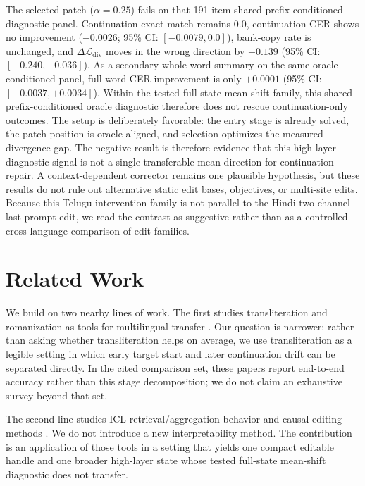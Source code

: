 \documentclass{article}
\begin{document}
The selected patch ($\alpha{=}0.25$) fails on that 191-item shared-prefix-conditioned diagnostic panel. Continuation exact match remains 0.0, continuation CER shows no improvement ($-0.0026$; 95\% CI: $[-0.0079, 0.0]$), bank-copy rate is unchanged, and $\Delta \mathcal{L}_{\mathrm{div}}$ moves in the wrong direction by $-0.139$ (95\% CI: $[-0.240, -0.036]$). As a secondary whole-word summary on the same oracle-conditioned panel, full-word CER improvement is only $+0.0001$ (95\% CI: $[-0.0037, +0.0034]$). Within the tested full-state mean-shift family, this shared-prefix-conditioned oracle diagnostic therefore does not rescue continuation-only outcomes. The setup is deliberately favorable: the entry stage is already solved, the patch position is oracle-aligned, and selection optimizes the measured divergence gap. The negative result is therefore evidence that this high-layer diagnostic signal is not a single transferable mean direction for continuation repair. A context-dependent corrector remains one plausible hypothesis, but these results do not rule out alternative static edit bases, objectives, or multi-site edits. Because this Telugu intervention family is not parallel to the Hindi two-channel last-prompt edit, we read the contrast as suggestive rather than as a controlled cross-language comparison of edit families.

\section{Related Work}

We build on two nearby lines of work. The first studies transliteration and romanization as tools for multilingual transfer \citep{transliticl, romanlens, scriptbarrier}. Our question is narrower: rather than asking whether transliteration helps on average, we use transliteration as a legible setting in which early target start and later continuation drift can be separated directly. In the cited comparison set, these papers report end-to-end accuracy rather than this stage decomposition; we do not claim an exhaustive survey beyond that set.

The second line studies ICL retrieval/aggregation behavior and causal editing methods \citep{reticl_survey, olsson2022, contextualize, patchingbest, rome, iti, actadd}. We do not introduce a new interpretability method. The contribution is an application of those tools in a setting that yields one compact editable handle and one broader high-layer state whose tested full-state mean-shift diagnostic does not transfer.
\end{document}
